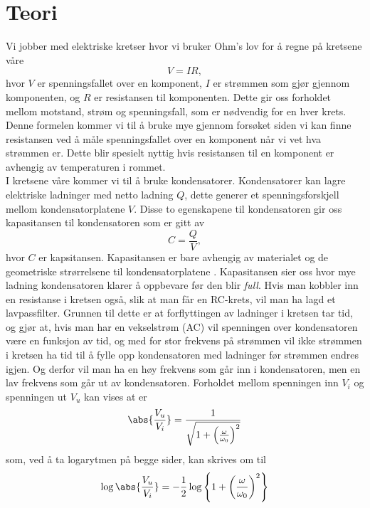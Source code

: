 \documentclass[%
 reprint,
 amsmath,amssymb,
 aps,
]{revtex4-1}
\begin{document}
\section{\label{teori}Teori}
Vi jobber med elektriske kretser hvor vi bruker Ohm's lov \cite{skaar} for å regne på kretsene våre
\begin{equation}
  V = IR \label{ohm},
\end{equation}
hvor $V$ er spenningsfallet over en komponent, $I$ er strømmen som gjør gjennom komponenten, og $R$ er resistansen til komponenten. Dette gir oss forholdet mellom motstand, strøm og spenningsfall, som er nødvendig for en hver krets. Denne formelen kommer vi til å bruke mye gjennom forsøket siden vi kan finne resistansen ved å måle spenningsfallet over en komponent når vi vet hva strømmen er. Dette blir spesielt nyttig hvis resistansen til en komponent er avhengig av temperaturen i rommet. \\
I kretsene våre kommer vi til å bruke kondensatorer. Kondensatorer kan lagre elektriske ladninger med netto ladning $Q$, dette generer et spenningsforskjell mellom kondensatorplatene $V$. Disse to egenskapene til kondensatoren gir oss kapasitansen til kondensatoren som er gitt av
\begin{equation}
  C = \frac{Q}{V},
\end{equation}
hvor $C$ er kapsitansen. Kapasitansen er bare avhengig av materialet og de geometriske strørrelsene til kondensatorplatene \cite{skaar}. Kapasitansen sier oss hvor mye ladning kondensatoren klarer å oppbevare før den blir \textit{full}. Hvis man kobbler inn en resistanse i kretsen også, slik at man får en RC-krets, vil man ha lagd et lavpassfilter. Grunnen til dette er at forflyttingen av ladninger i kretsen tar tid, og gjør at, hvis man har en vekselstrøm (AC) vil spenningen over kondensatoren være en funksjon av tid, og med for stor frekvens på strømmen vil ikke strømmen i kretsen ha tid til å fylle opp kondensatoren med ladninger før strømmen endres igjen. Og derfor vil man ha en høy frekvens som går inn i kondensatoren, men en lav frekvens som går ut av kondensatoren. Forholdet mellom spenningen inn $V_i$ og spenningen ut $V_u$ kan vises at \cite{oppgave} er
\begin{equation}
  \abs{\frac{V_u}{V_i}} = \frac{1}{\sqrt{1+\left(\frac{\omega}{\omega_0}\right)^2}}
\end{equation}som, ved å ta logarytmen på begge sider, kan skrives om til
\begin{equation}
  \log\abs{\frac{V_u}{V_i}} = -\frac{1}{2}\log\left\{1+\left(\frac{\omega}{\omega_0}\right)^2 \right\}
\end{equation}
\end{document}
